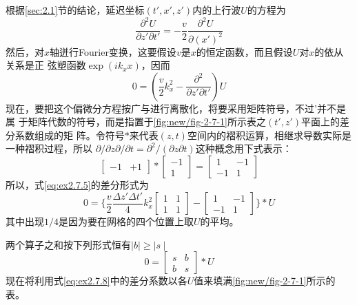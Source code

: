 根据\ref{sec:2.1}节的结论，延迟坐标$(t',x',z')$内的上行波$U$的方程为
\begin{equation}
\frac{\partial^2 U}{\partial z'\partial t'}=-\frac{v}{2}\frac{\partial^2 U}{\partial (x')^2}
\label{eq:ex2.7.4}
\end{equation}
然后，对$x$轴迸行Fourier变换，这要假设$v$是$x$的恒定函数，而且假设$U$对$x$的依从关系是正
弦塑函数$\exp(ik_xx)$，因而
\begin{equation}
0=(\frac{v}{2}k_x^2-\frac{\partial^2 }{\partial z'\partial t'})U
\label{eq:ex2.7.5}
\end{equation}
现在，要把这个偏微分方程按广与进行离散化，将要采用矩阵符号，不过'并不是属
于矩阵代数的符号，而是指置于\ref{fig:new/fig-2-7-1}所示表之$(t',z')$平面上的差分系数组成的矩
阵。令符号$*$来代表$(z,t)$空间内的褶积运算，相继求导数实际是一种褶积过程，所以
$\partial/\partial z \partial/\partial t=\partial^2/(\partial z\partial t)$这种概念用下式表示：
\begin{equation}
\begin{bmatrix}
-1 & +1
\end{bmatrix}
*
\begin{bmatrix}
-1 \\
1
\end{bmatrix}
=
\begin{bmatrix}
1&-1\\
-1&1
\end{bmatrix}
\label{eq:ex2.7.6}
\end{equation}
所以，式\ref{eq:ex2.7.5}的差分形式为
\begin{equation}
0=\{\frac{v}{2}\frac{\Delta z'\Delta t'}{4}k_x^2
\begin{bmatrix}
1&1\\
1&1
\end{bmatrix}
-
\begin{bmatrix}
1&-1\\
-1&1
\end{bmatrix} 
\}*U
\label{eq:ex2.7.7}
\end{equation}
其中出现$1/4$是因为要在网格的四个位置上取$U$的平均。

两个算子之和按下列形式恒有$\mid b \mid \geq \mid s \mid $
\begin{equation}
0 = 
\begin{bmatrix}
s&b\\
b&s
\end{bmatrix}
*U
\label{eq:ex2.7.8}
\end{equation}
现在将利用式\ref{eq:ex2.7.8}中的差分系数以各$U$值来填满\ref{fig:new/fig-2-7-1}所示的表。

